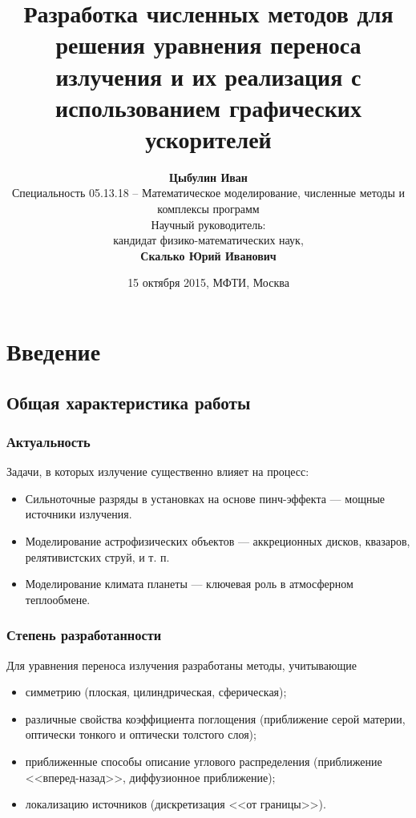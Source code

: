 \documentclass[unicode,aspectratio=43]{beamer}
\title[Численные методы решения УПИ]{Разработка численных методов для решения уравнения переноса излучения и их реализация с использованием графических ускорителей}
\date{15 октября 2015, МФТИ, Москва}
\author[Цыбулин Иван]{\textbf{Цыбулин Иван}\\[1ex]
Специальность 05.13.18 -- Математическое моделирование, численные методы и
комплексы программ\\[1ex]
Научный руководитель:\\
кандидат физико-математических наук,\\
\textbf{Скалько Юрий Иванович}}
\institute[МФТИ]{Московский физико-технический институт}
\begin{document}
\begin{frame}[plain]
\maketitle
\end{frame}

\begin{frame}[plain]
\footnotesize
\tableofcontents
\end{frame}

\section{Введение}

\subsection{Общая характеристика работы}

\begin{frame}\frametitle{Актуальность}
	Задачи, в которых излучение существенно влияет на процесс:
	\begin{itemize}
	\item Сильноточные разряды в установках на основе пинч-эффекта --- мощные источники излучения.
	\item Моделирование астрофизических объектов --- аккреционных дисков, квазаров, релятивистских струй, и т. п.
	\item Моделирование климата планеты --- ключевая роль в атмосферном теплообмене.
	\end{itemize}
\end{frame}

\begin{frame}\frametitle{Степень разработанности}
	Для уравнения переноса излучения разработаны методы, учитывающие
	\begin{itemize}
	\item симметрию (плоская, цилиндрическая, сферическая);
	\item различные свойства коэффициента поглощения (приближение серой материи, оптически тонкого и оптически толстого слоя);
	\item приближенные способы описание углового распределения (приближение <<вперед-назад>>, диффузионное приближение);
	\item локализацию источников (дискретизация <<от границы>>).
	\end{itemize}
\end{frame}
\end{document}

